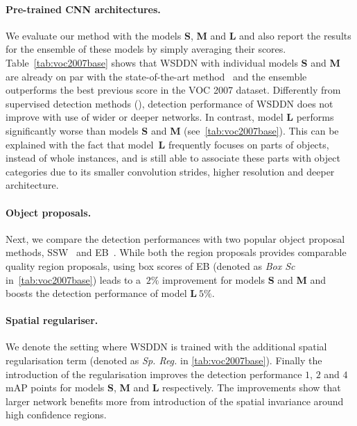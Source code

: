 \documentclass[10pt,twocolumn,letterpaper]{article}
\begin{document}
\paragraph{Pre-trained CNN architectures.} We evaluate our method with the models \textbf{S}, \textbf{M} and \textbf{L} and also report the results for the ensemble of these models by simply averaging their scores. Table~\ref{tab:voc2007base} shows that WSDDN with individual models \textbf{S} and \textbf{M} are already on par with the state-of-the-art method~\cite{Wang14a} and the ensemble outperforms the best previous score in the VOC 2007 dataset. Differently from supervised detection methods (\eg\cite{Girshick15}), detection performance of WSDDN does not improve with use of wider or deeper networks. In contrast, model \textbf{L} performs significantly worse than models \textbf{S} and \textbf{M} (see~\cref{tab:voc2007base}). This can be explained with the fact that model~\textbf{L} frequently focuses on parts of objects, instead of whole instances, and is still able to associate these parts with object categories due to its smaller convolution strides, higher resolution and deeper architecture.

\paragraph{Object proposals.} Next, we compare the detection performances with two popular object proposal methods, SSW~\cite{Sande11} and EB~\cite{Zitnick14}. While both the region proposals provides comparable quality region proposals, using box scores of EB (denoted as \emph{Box Sc} in~\cref{tab:voc2007base}) leads to a $~2\%$ improvement for models \textbf{S} and \textbf{M} and boosts the detection performance of model \textbf{L}$~5\%$.

\paragraph{Spatial regulariser.} We denote the setting where WSDDN is trained with the additional spatial regularisation term (denoted as \emph{Sp. Reg.} in \cref{tab:voc2007base}). Finally the introduction of the regularisation improves the detection performance $1$, $2$ and $4$ mAP points for models \textbf{S}, \textbf{M} and \textbf{L} respectively. The improvements show that larger network benefits more from introduction of the spatial invariance around high confidence regions.
\end{document}
